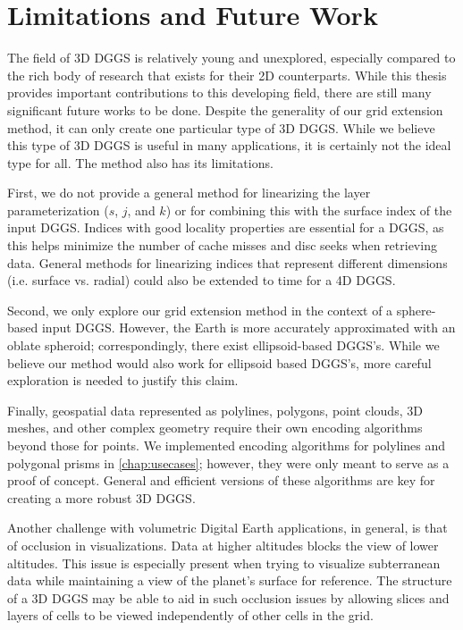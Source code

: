 \section{Limitations and Future Work}
The field of 3D DGGS is relatively young and unexplored, especially compared to the rich body of research that exists for their 2D counterparts.
While this thesis provides important contributions to this developing field, there are still many significant future works to be done.
Despite the generality of our grid extension method, it can only create one particular type of 3D DGGS.
While we believe this type of 3D DGGS is useful in many applications, it is certainly not the ideal type for all.
The method also has its limitations.


First, we do not provide a general method for linearizing the layer parameterization ($s$, $j$, and $k$) or for combining this with the surface index of the input DGGS.
Indices with good locality properties are essential for a DGGS, as this helps minimize the number of cache misses and disc seeks when retrieving data.
General methods for linearizing indices that represent different dimensions (i.e. surface vs. radial) could also be extended to time for a 4D DGGS.


Second, we only explore our grid extension method in the context of a sphere-based input DGGS.
However, the Earth is more accurately approximated with an oblate spheroid; correspondingly, there exist ellipsoid-based DGGS's.
While we believe our method would also work for ellipsoid based DGGS's, more careful exploration is needed to justify this claim.


Finally, geospatial data represented as polylines, polygons, point clouds, 3D meshes, and other complex geometry require their own encoding algorithms beyond those for points.
We implemented encoding algorithms for polylines and polygonal prisms in \cref{chap:usecases}; however, they were only meant to serve as a proof of concept.
General and efficient versions of these algorithms are key for creating a more robust 3D DGGS.


Another challenge with volumetric Digital Earth applications, in general, is that of occlusion in visualizations.
Data at higher altitudes blocks the view of lower altitudes.
This issue is especially present when trying to visualize subterranean data while maintaining a view of the planet's surface for reference.
The structure of a 3D DGGS may be able to aid in such occlusion issues by allowing slices and layers of cells to be viewed independently of other cells in the grid.
